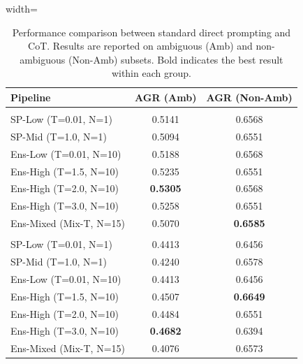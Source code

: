 \documentclass[11pt]{article}
\begin{document}
\begin{table}[htbp]
\centering
\small
\begin{adjustbox}{width=\linewidth}
\begin{tabular}{lcc}
\toprule
Pipeline & AGR (Amb) & AGR (Non-Amb) \\
\midrule
\rowcolor{gray!5}
\multicolumn{3}{l}{\textbf{Direct}} \\
\addlinespace[2pt]
SP-Low (T=0.01, N=1)    & 0.5141 & 0.6568 \\
SP-Mid (T=1.0, N=1)     & 0.5094 & 0.6551 \\
Ens-Low (T=0.01, N=10)  & 0.5188 & 0.6568 \\
Ens-High (T=1.5, N=10)  & 0.5235 & 0.6551 \\
Ens-High (T=2.0, N=10)  & \textbf{0.5305} & 0.6568 \\
Ens-High (T=3.0, N=10)  & 0.5258 & 0.6551 \\
Ens-Mixed (Mix-T, N=15) & 0.5070 & \textbf{0.6585} \\

\midrule
\rowcolor{gray!5}
\addlinespace[1pt]
\multicolumn{3}{l}{\textbf{Chain-of-Thought}} \\
\addlinespace[2pt]
SP-Low (T=0.01, N=1)    & 0.4413 & 0.6456 \\
SP-Mid (T=1.0, N=1)     & 0.4240 & 0.6578 \\
Ens-Low (T=0.01, N=10)  & 0.4413 & 0.6456 \\
Ens-High (T=1.5, N=10)  & 0.4507 & \textbf{0.6649} \\
Ens-High (T=2.0, N=10)  & 0.4484 & 0.6551 \\
Ens-High (T=3.0, N=10)  & \textbf{0.4682} & 0.6394 \\
Ens-Mixed (Mix-T, N=15) & 0.4076 & 0.6573 \\

\bottomrule
\end{tabular}
\end{adjustbox}
\caption{
Performance comparison between standard direct prompting and CoT. Results are reported on ambiguous (Amb) and non-ambiguous (Non-Amb) subsets. Bold indicates the best result within each group.
}
\label{tab:exp2_baseline_cot_block}
\end{table}
\end{document}
